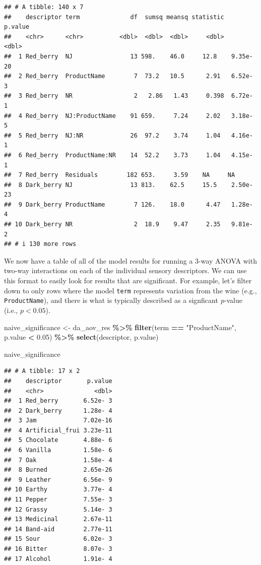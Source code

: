 \documentclass[
]{book}
\newenvironment{Shaded}{\begin{snugshade}}{\end{snugshade}}
\newcommand{\FloatTok}[1]{\textcolor[rgb]{0.00,0.00,0.81}{#1}}
\newcommand{\FunctionTok}[1]{\textcolor[rgb]{0.13,0.29,0.53}{\textbf{#1}}}
\newcommand{\NormalTok}[1]{#1}
\newcommand{\OtherTok}[1]{\textcolor[rgb]{0.56,0.35,0.01}{#1}}
\newcommand{\SpecialCharTok}[1]{\textcolor[rgb]{0.81,0.36,0.00}{\textbf{#1}}}
\newcommand{\StringTok}[1]{\textcolor[rgb]{0.31,0.60,0.02}{#1}}
\begin{document}
\begin{verbatim}
## # A tibble: 140 x 7
##    descriptor term              df  sumsq meansq statistic   p.value
##    <chr>      <chr>          <dbl>  <dbl>  <dbl>     <dbl>     <dbl>
##  1 Red_berry  NJ                13 598.    46.0     12.8    9.35e-20
##  2 Red_berry  ProductName        7  73.2   10.5      2.91   6.52e- 3
##  3 Red_berry  NR                 2   2.86   1.43     0.398  6.72e- 1
##  4 Red_berry  NJ:ProductName    91 659.     7.24     2.02   3.18e- 5
##  5 Red_berry  NJ:NR             26  97.2    3.74     1.04   4.16e- 1
##  6 Red_berry  ProductName:NR    14  52.2    3.73     1.04   4.15e- 1
##  7 Red_berry  Residuals        182 653.     3.59    NA     NA       
##  8 Dark_berry NJ                13 813.    62.5     15.5    2.50e-23
##  9 Dark_berry ProductName        7 126.    18.0      4.47   1.28e- 4
## 10 Dark_berry NR                 2  18.9    9.47     2.35   9.81e- 2
## # i 130 more rows
\end{verbatim}

We now have a table of all of the model results for running a 3-way ANOVA with two-way interactions on each of the individual sensory descriptors. We can use this format to easily look for results that are significant. For example, let's filter down to only rows where the model \texttt{term} represents variation from the wine (e.g., \texttt{ProductName}), and there is what is typically described as a signficant \emph{p}-value (i.e., \(p<0.05\)).

\begin{Shaded}
\begin{Highlighting}[]
\NormalTok{naive\_significance }\OtherTok{\textless{}{-}} 
\NormalTok{  da\_aov\_res }\SpecialCharTok{\%\textgreater{}\%}
  \FunctionTok{filter}\NormalTok{(term }\SpecialCharTok{==} \StringTok{"ProductName"}\NormalTok{,}
\NormalTok{         p.value }\SpecialCharTok{\textless{}} \FloatTok{0.05}\NormalTok{) }\SpecialCharTok{\%\textgreater{}\%}
  \FunctionTok{select}\NormalTok{(descriptor, p.value)}

\NormalTok{naive\_significance}
\end{Highlighting}
\end{Shaded}

\begin{verbatim}
## # A tibble: 17 x 2
##    descriptor       p.value
##    <chr>              <dbl>
##  1 Red_berry       6.52e- 3
##  2 Dark_berry      1.28e- 4
##  3 Jam             7.02e-16
##  4 Artificial_frui 3.23e-11
##  5 Chocolate       4.88e- 6
##  6 Vanilla         1.58e- 6
##  7 Oak             1.58e- 4
##  8 Burned          2.65e-26
##  9 Leather         6.56e- 9
## 10 Earthy          3.77e- 4
## 11 Pepper          7.55e- 3
## 12 Grassy          5.14e- 3
## 13 Medicinal       2.67e-11
## 14 Band-aid        2.77e-11
## 15 Sour            6.02e- 3
## 16 Bitter          8.07e- 3
## 17 Alcohol         1.91e- 4
\end{verbatim}
\end{document}

